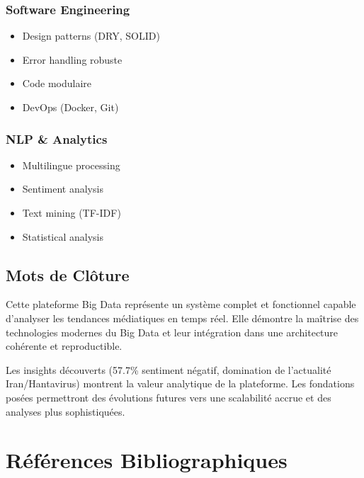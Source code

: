 \documentclass[12pt,a4paper]{report}
\begin{document}
\subsection{Software Engineering}

\begin{itemize}
    \item Design patterns (DRY, SOLID)
    \item Error handling robuste
    \item Code modulaire
    \item DevOps (Docker, Git)
\end{itemize}

\subsection{NLP \& Analytics}

\begin{itemize}
    \item Multilingue processing
    \item Sentiment analysis
    \item Text mining (TF-IDF)
    \item Statistical analysis
\end{itemize}

\section{Mots de Clôture}

Cette plateforme Big Data représente un système complet et fonctionnel capable d'analyser les tendances médiatiques en temps réel. Elle démontre la maîtrise des technologies modernes du Big Data et leur intégration dans une architecture cohérente et reproductible.

Les insights découverts (57.7\% sentiment négatif, domination de l'actualité Iran/Hantavirus) montrent la valeur analytique de la plateforme. Les fondations posées permettront des évolutions futures vers une scalabilité accrue et des analyses plus sophistiquées.

\chapter*{Références Bibliographiques}
\end{document}
